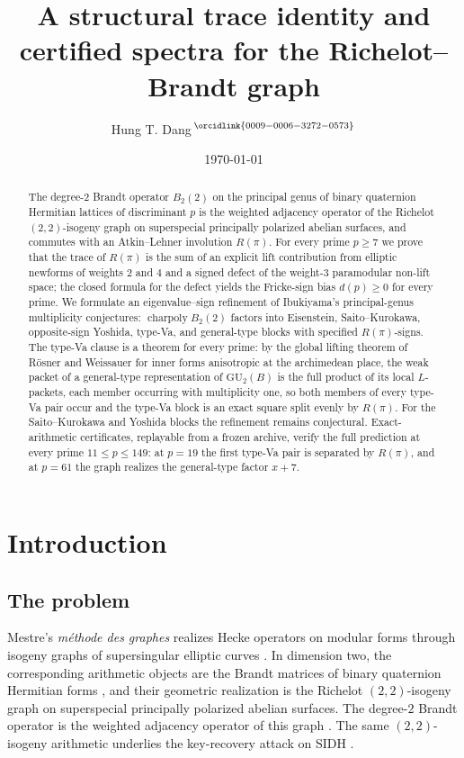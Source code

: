 \documentclass[11pt]{amsart}
\title[Richelot--Brandt graph and certified spectra]{A structural trace identity and certified spectra for the Richelot--Brandt graph}
\author{Hung T. Dang\,$^{\orcidlink{0009-0006-3272-0573}}$}
\date{\today}
\theoremstyle{plain}
\theoremstyle{definition}
\newcommand{\GU}{\mathrm{GU}}
\begin{document}
	
	\begin{abstract}
		The degree-$2$ Brandt operator $B_2(2)$ on the principal genus of binary
		quaternion Hermitian lattices of discriminant $p$ is the weighted
		adjacency operator of the Richelot $(2,2)$-isogeny graph on superspecial
		principally polarized abelian surfaces, and commutes with an
		Atkin--Lehner involution $R(\pi)$. For every prime $p\ge7$ we prove that
		the trace of $R(\pi)$ is the sum of an explicit lift contribution from
		elliptic newforms of weights $2$ and $4$ and a signed defect of the
		weight-$3$ paramodular non-lift space; the closed formula for the defect
		yields the Fricke-sign bias $d(p)\ge0$ for every prime. We formulate
		an eigenvalue--sign refinement of Ibukiyama's principal-genus
		multiplicity conjectures: $\operatorname{charpoly}B_2(2)$ factors into
		Eisenstein, Saito--Kurokawa, opposite-sign Yoshida, type-Va, and
		general-type blocks with specified $R(\pi)$-signs. The
		type-Va clause is a theorem for every prime: by the global lifting
		theorem of R\"osner and Weissauer for inner forms anisotropic at the
		archimedean place, the weak packet of a general-type representation
		of $\GU_2(B)$ is the full product of its local $L$-packets, each
		member occurring with multiplicity one, so both members of every
		type-Va pair occur and the type-Va block is an exact square split
		evenly by $R(\pi)$. For the Saito--Kurokawa and Yoshida blocks the
		refinement remains conjectural. Exact-arithmetic certificates, replayable from a
		frozen archive, verify the full prediction at every prime
		$11\le p\le149$: at $p=19$ the first type-Va pair is separated
		by $R(\pi)$, and at $p=61$ the graph realizes the general-type factor
		$x+7$.
	\end{abstract}
	
	\maketitle
	
	\section{Introduction}\label{sec:intro}
	
	\subsection{The problem}\label{ss:problem}
	
	Mestre's \emph{m\'ethode des graphes} realizes Hecke operators on modular
	forms through isogeny graphs of supersingular elliptic curves
	\cite{Mestre1986}. In dimension two, the corresponding arithmetic objects
	are the Brandt matrices of binary quaternion Hermitian forms
	\cite{Hashimoto1980,HashimotoIbukiyama}, and their geometric realization is
	the Richelot $(2,2)$-isogeny graph on superspecial principally polarized
	abelian surfaces. The degree-$2$ Brandt operator is the weighted adjacency
	operator of this graph \cite[Thm.~39]{JordanZaytman}. The same
	$(2,2)$-isogeny arithmetic underlies the key-recovery attack on SIDH
	\cite{CastryckDecru}.
	
\end{document}
